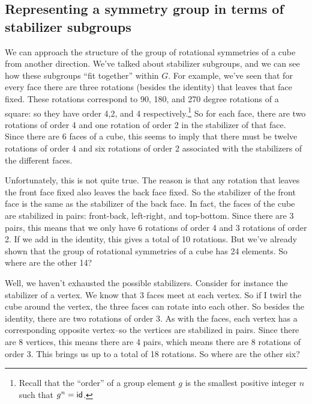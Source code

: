\subsection{Representing a symmetry group in terms of stabilizer subgroups}
We can approach the structure of the group of rotational symmetries of a cube from another direction.  We've talked about stabilizer subgroups, and we can see how these subgroups ``fit together'' within $G$.
For example, we've seen that for every face there are three rotations (besides the identity) that leaves that face fixed. These rotations correspond to 90, 180, and 270 degree rotations of a square: so they have order 4,2, and 4 respectively.\footnote{Recall that the ``order'' of a group element $g$ is the smallest positive integer $n$ such that $g^n = \sf{id}$.} So for each face, there are two rotations of order 4 and one rotation of order 2 in the stabilizer of that face. Since there are 6 faces of a cube, this seems to imply that there must be twelve rotations of order 4 and six rotations of order 2 associated with the stabilizers of the different faces.  

Unfortunately, this is not quite true. The reason is that any rotation that leaves the front face fixed also leaves the back face fixed. So the stabilizer of the front face is the same as the stabilizer  of the back face. In fact, the faces of the cube are stabilized in pairs: front-back, left-right, and top-bottom. Since there are 3 pairs, this means that we only have 6 rotations of order 4 and 3 rotations of order 2. If we add in the identity, this gives a total of 10 rotations. But we've already shown that the group of rotational symmetries of a cube has 24 elements. So where are the other 14?

Well, we haven't exhausted the possible stabilizers. Consider for instance the stabilizer of a vertex. We know that 3 faces meet at each vertex. So if I twirl the cube around the vertex, the three faces can rotate into each other. So besides the identity, there are two rotations of order 3. As with the faces, each vertex has a corresponding opposite vertex--so the vertices are stabilized in pairs. Since there are 8 vertices, this means there are 4 pairs, which means there are 8 rotations of order 3. This brings us up to a total of 18 rotations. So where are the other six?

